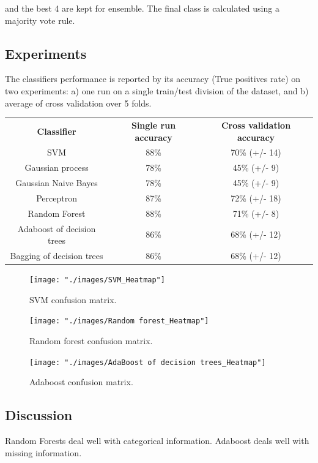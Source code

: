 \documentclass{article}
\begin{document}
 and the best 4 are kept for ensemble. The final class is calculated using a majority vote rule. 



\subsection{Experiments}
The classifiers performance is reported by its accuracy (True positives rate) on two experiments: a) one run on a single train/test division of the dataset, and b) average of cross validation over 5 folds. 

\begin{tabular}{|c|c|c|}
\textbf{Classifier} & \textbf{Single run accuracy} & \textbf{Cross validation accuracy} \\
SVM & 88\% & 70\% (+/- 14)\\
Gaussian process & 78\% & 45\% (+/- 9)\\
Gaussian Naive Bayes & 78\% & 45\% (+/- 9)\\
Perceptron & 87\% & 72\% (+/- 18)\\
Random Forest & 88\% & 71\% (+/- 8)\\
Adaboost of decision trees & 86\% & 68\% (+/- 12)\\
Bagging of decision trees & 86\% & 68\% (+/- 12)\\
\end{tabular}

\begin{figure}[H]
  \centering
  \texttt{[image: "./images/SVM\_Heatmap"]}
  \caption{SVM confusion matrix.}
  \label{fig:classification/svm_confusion}
\end{figure}

\begin{figure}[H]
  \centering
  \texttt{[image: "./images/Random forest\_Heatmap"]}
  \caption{Random forest confusion matrix.}
  \label{fig:classification/rf_confusion}
\end{figure}


\begin{figure}[H]
  \centering
  \texttt{[image: "./images/AdaBoost of decision trees\_Heatmap"]}
  \caption{Adaboost confusion matrix.}
  \label{fig:classification/adb_confusion}
\end{figure}


\subsection{Discussion}
Random Forests deal well with categorical information. Adaboost deals well with missing information.
\end{document}

